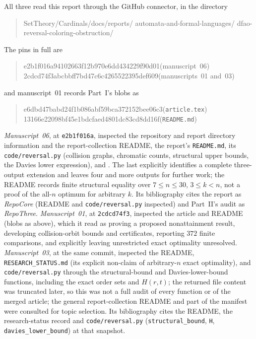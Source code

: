 \documentclass[11pt,a4paper]{article}
\numberwithin{equation}{section}
\theoremstyle{definition}
\theoremstyle{remark}
\begin{document}
All three read this report through the GitHub connector, in the directory
\begin{quote}\small\ttfamily\raggedright
SetTheory/Cardinals/docs/reports/\allowbreak
automata-and-formal-languages/\allowbreak
dfao-reversal-coloring-obstruction/
\end{quote}
The pins in full are
\begin{quote}\small\ttfamily
e2b1f016a94102663f12b970e6dd434229f90d01\hfill\normalfont(manuscript~06)\\
2cdcd74f3abcbbff7bd47c6c4265522395def609\hfill\normalfont(manuscripts~01 and~03)
\end{quote}
and manuscript~01 records Part~I's blobs as
\begin{quote}\small\ttfamily
e6dbd47babd24f1b086abf59bca372152bee06c3\hfill\normalfont(\texttt{article.tex})\\
13166e22098bf45e1bdcfaed4801dc83cd8dd16f\hfill\normalfont(\texttt{README.md})
\end{quote}
\emph{Manuscript~06}, at \texttt{e2b1f016a}, inspected the repository and report
directory information and the report-collection README, the report's
\texttt{README.md}, its \texttt{code/reversal.py} (collision graphs, chromatic
counts, structural upper bounds, the Davies lower expression), and
. The last explicitly identifies a
complete three-output extension and leaves four and more outputs for further
work; the README records finite structural equality over $7\le n\le30$,
$3\le k<n$, not a proof of the all-$n$ optimum for arbitrary $k$. Its
bibliography cites the report as \emph{RepoCore} (README and
\texttt{code/reversal.py} inspected) and Part~II's audit as \emph{RepoThree}.
\emph{Manuscript~01}, at \texttt{2cdcd74f3}, inspected the article and
README (blobs as above), which it read as proving a proposed nonattainment result, developing collision-orbit
bounds and certificates, reporting $372$ finite comparisons, and explicitly
leaving unrestricted exact optimality unresolved. \emph{Manuscript~03}, at the
same commit, inspected the README, \texttt{RESEARCH\_STATUS.md} (its explicit non-claim
of arbitrary-$n$ exact optimality), and \texttt{code/reversal.py} through the
structural-bound and Davies-lower-bound functions, including the exact order
sets and $H(r,t)$; the returned file content was truncated later, so this
was not a full audit of every function or of the merged article; the general
report-collection README and part of the manifest were consulted for topic
selection. Its bibliography cites the README, the research-status record and
\texttt{code/reversal.py} (\texttt{structural\_bound}, \texttt{H},
\texttt{davies\_lower\_bound}) at that snapshot.
\end{document}
